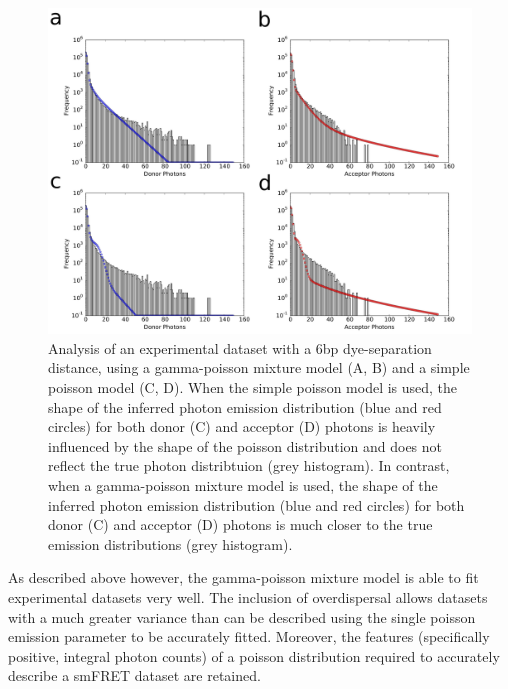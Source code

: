 \begin{figure}
   \begin{center}
      \includegraphics*[width=5in]{inference/poisson_vs_gp.pdf}
      \caption{Analysis of an experimental dataset with a 6bp dye-separation distance, using a gamma-poisson mixture model (A, B) and a simple poisson model (C, D). When the simple poisson model is used, the shape of the inferred photon emission distribution (blue and red circles) for both donor (C) and acceptor (D) photons is heavily influenced by the shape of the poisson distribution and does not reflect the true photon distribtuion (grey histogram). In contrast, when a gamma-poisson mixture model is used, the shape of the inferred photon emission distribution (blue and red circles) for both donor (C) and acceptor (D) photons is much closer to the true emission distributions (grey histogram).}
      \label{fig:super_poisson}
   \end{center}
\end{figure}

As described above however, the gamma-poisson mixture model is able to fit experimental datasets very well. The inclusion of overdispersal allows datasets with a much greater variance than can be described using the single poisson emission parameter to be accurately fitted. Moreover, the features (specifically positive, integral photon counts) of a poisson distribution required to accurately describe a smFRET dataset are retained.

